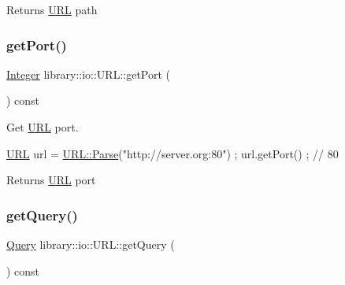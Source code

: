 \begin{DoxyReturn}{Returns}
\hyperlink{classlibrary_1_1io_1_1_u_r_l}{U\+RL} path 
\end{DoxyReturn}
\mbox{\label{classlibrary_1_1io_1_1_u_r_l_aa74b35304944c4686800eef65e464afd}} 
\subsubsection{\texorpdfstring{get\+Port()}{getPort()}}
{\footnotesize\ttfamily \hyperlink{namespacelibrary_1_1io_a0a929bf9e177597c2e92073d200dda53}{Integer} library\+::io\+::\+U\+R\+L\+::get\+Port (\begin{DoxyParamCaption}{ }\end{DoxyParamCaption}) const}



Get \hyperlink{classlibrary_1_1io_1_1_u_r_l}{U\+RL} port. 


\begin{DoxyCode}
\hyperlink{classlibrary_1_1io_1_1_u_r_l_a7e9c070138a6dbd000ffb10b7cd8a5c4}{URL} url = \hyperlink{classlibrary_1_1io_1_1_u_r_l_a03a589af0787df20428d4d33e26bb2d7}{URL::Parse}(\textcolor{stringliteral}{"http://server.org:80"}) ;
url.getPort() ; \textcolor{comment}{// 80}
\end{DoxyCode}


\begin{DoxyReturn}{Returns}
\hyperlink{classlibrary_1_1io_1_1_u_r_l}{U\+RL} port 
\end{DoxyReturn}
\mbox{\label{classlibrary_1_1io_1_1_u_r_l_a9e2dfc922d148118443d8247679a28c1}} 
\subsubsection{\texorpdfstring{get\+Query()}{getQuery()}}
{\footnotesize\ttfamily \hyperlink{namespacelibrary_1_1io_a39ebaf2265de78ba79eb5347f2af61b3}{Query} library\+::io\+::\+U\+R\+L\+::get\+Query (\begin{DoxyParamCaption}{ }\end{DoxyParamCaption}) const}




